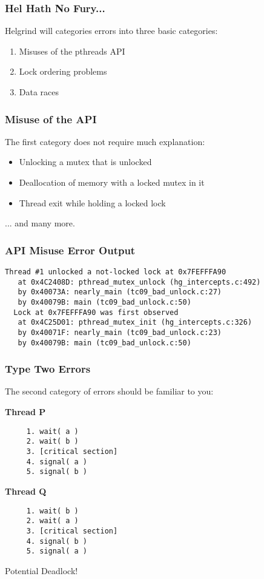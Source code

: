 \begin{frame}
\frametitle{Hel Hath No Fury...}

Helgrind will categories errors into three basic categories:

\begin{enumerate}
	\item Misuses of the pthreads API
	\item Lock ordering problems
	\item Data races
\end{enumerate}


\end{frame}

\begin{frame}
\frametitle{Misuse of the API}

The first category does not require much explanation:


\begin{itemize}
	\item Unlocking a mutex that is unlocked
	\item Deallocation of memory with a locked mutex in it
	\item Thread exit while holding a locked lock
\end{itemize}
... and many more.


\end{frame}

\begin{frame}[fragile]
\frametitle{API Misuse Error Output}


\begin{verbatim}
Thread #1 unlocked a not-locked lock at 0x7FEFFFA90
   at 0x4C2408D: pthread_mutex_unlock (hg_intercepts.c:492)
   by 0x40073A: nearly_main (tc09_bad_unlock.c:27)
   by 0x40079B: main (tc09_bad_unlock.c:50)
  Lock at 0x7FEFFFA90 was first observed
   at 0x4C25D01: pthread_mutex_init (hg_intercepts.c:326)
   by 0x40071F: nearly_main (tc09_bad_unlock.c:23)
   by 0x40079B: main (tc09_bad_unlock.c:50)
\end{verbatim}

\end{frame}

\begin{frame}[fragile]
\frametitle{Type Two Errors}

The second category of errors should be familiar to you:

\begin{multicols}{2}
\textbf{Thread P}
  \begin{verbatim}
	 1. wait( a ) 
	 2. wait( b )
	 3. [critical section]
	 4. signal( a )
	 5. signal( b )
  \end{verbatim}
\columnbreak
\textbf{Thread Q}
  \begin{verbatim}
	 1. wait( b ) 
	 2. wait( a )
	 3. [critical section]
	 4. signal( b )
	 5. signal( a )
  \end{verbatim}
\end{multicols}
\vspace{-2em}

Potential Deadlock!

\end{frame}

